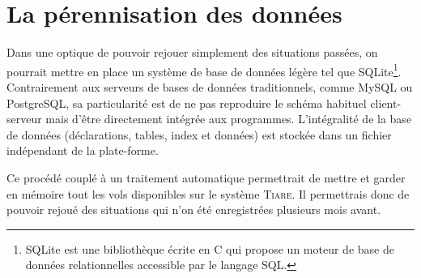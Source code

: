 \section{La pérennisation des données}
Dans une optique de pouvoir rejouer simplement des situations passées, on pourrait mettre en place un système de base de données légère tel que SQLite\footnote{SQLite est une bibliothèque écrite en C qui propose un moteur de base de données relationnelles accessible par le langage SQL.}. Contrairement aux serveurs de bases de données traditionnels, comme MySQL ou PostgreSQL, sa particularité est de ne pas reproduire le schéma habituel client-serveur mais d'être directement intégrée aux programmes. L'intégralité de la base de données (déclarations, tables, index et données) est stockée dans un fichier indépendant de la plate-forme.

Ce procédé couplé à un traitement automatique permettrait de mettre et garder en mémoire tout les vols disponibles sur le système \textsc{Tiare}. Il permettrais donc de pouvoir rejoué des situations qui n'on été enregistrées plusieurs mois avant. 



